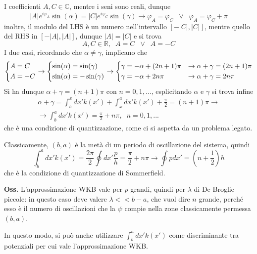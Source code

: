 I coefficienti $A,C\in\mathbb{C}$, mentre i seni sono reali, dunque
$$|A|e^{i\varphi_A}\sin(\alpha)=|C|e^{i\varphi_C}\sin(\gamma) \rightarrow \varphi_A = \varphi_C
\phantom{x}\lor\phantom{x}\varphi_A = \varphi_C+\pi$$
inoltre, il modulo del LHS è un numero nell'intervallo $[-|C|,|C|]$, mentre quello del RHS in
$[-|A|,|A|]$, dunque $|A|=|C|$ e si trova
$$A,C\in\mathbb{R},\phantom{x}A=C\phantom{x}\lor\phantom{x}A=-C$$
I due casi, ricordando che $\alpha\not=\gamma$, implicano che
$$
\begin{dcases}
    A=C\\
    A=-C
\end{dcases}
\rightarrow
\begin{dcases}
\sin(\alpha)=\sin(\gamma) \\
\sin(\alpha)=-\sin(\gamma)
\end{dcases}
\rightarrow
\begin{dcases}
    \gamma=-\alpha+(2n+1)\pi&\rightarrow\alpha+\gamma=(2n+1)\pi\\ 
    \gamma=-\alpha+2n\pi&\rightarrow\alpha+\gamma = 2n\pi
\end{dcases}
$$
Si ha dunque $\alpha+\gamma=(n+1)\pi$ con $n=0,1,...$, esplicitando $\alpha$ e $\gamma$ si trova infine
\begin{gather*}
\alpha+\gamma = \int_{b}^{x}dx'k(x') + \int_{x}^{a}dx'k(x') +\frac{\pi}{2} = (n+1)\pi \rightarrow\\
\rightarrow\boxed{\int_{b}^{a}dx'k(x') = \frac{\pi}{2}+n\pi,\phantom{x}n=0,1,...}
\end{gather*}
che è una condizione di quantizzazione, come ci si aspetta da un problema legato.

Classicamente, $(b,a)$ è la metà di un periodo di oscillazione del sistema, quindi
$$\int_{b}^{a}dx'k(x') = \frac{2\pi}{2}\oint dx'\frac{p}{h} = \frac{\pi}{2}+n\pi \rightarrow
\oint pdx' = \left(n+\frac{1}{2}\right)h
$$
che è la condizione di quantizzazione di Sommerfield.

\textbf{Oss.} L'approssimazione WKB vale per $p$ grandi, quindi per $\lambda$ di De Broglie
piccole: in questo caso deve valere $\lambda<<b-a$, che vuol dire $n$ grande, perché esso è il numero
di oscillazioni che la $\psi$ compie nella zone classicamente permessa $(b,a)$.

In questo modo, si può anche utilizzare $\int_{b}^{a}dx'k(x')$ come discriminante tra potenziali per
cui vale l'approssimazione WKB.

